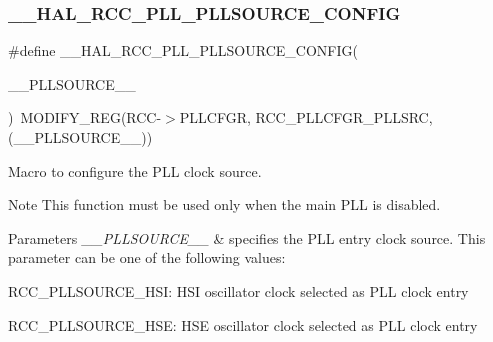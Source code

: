 \subsubsection{\texorpdfstring{\+\_\+\+\_\+\+H\+A\+L\+\_\+\+R\+C\+C\+\_\+\+P\+L\+L\+\_\+\+P\+L\+L\+S\+O\+U\+R\+C\+E\+\_\+\+C\+O\+N\+F\+IG}{\_\_HAL\_RCC\_PLL\_PLLSOURCE\_CONFIG}}
{\footnotesize\ttfamily \#define \+\_\+\+\_\+\+H\+A\+L\+\_\+\+R\+C\+C\+\_\+\+P\+L\+L\+\_\+\+P\+L\+L\+S\+O\+U\+R\+C\+E\+\_\+\+C\+O\+N\+F\+IG(\begin{DoxyParamCaption}\item[{}]{\+\_\+\+\_\+\+P\+L\+L\+S\+O\+U\+R\+C\+E\+\_\+\+\_\+ }\end{DoxyParamCaption})~M\+O\+D\+I\+F\+Y\+\_\+\+R\+EG(R\+CC-\/$>$P\+L\+L\+C\+F\+GR, R\+C\+C\+\_\+\+P\+L\+L\+C\+F\+G\+R\+\_\+\+P\+L\+L\+S\+RC, (\+\_\+\+\_\+\+P\+L\+L\+S\+O\+U\+R\+C\+E\+\_\+\+\_\+))}



Macro to configure the P\+LL clock source. 

\begin{DoxyNote}{Note}
This function must be used only when the main P\+LL is disabled. 
\end{DoxyNote}

\begin{DoxyParams}{Parameters}
{\em \+\_\+\+\_\+\+P\+L\+L\+S\+O\+U\+R\+C\+E\+\_\+\+\_\+} & specifies the P\+LL entry clock source. This parameter can be one of the following values\+: \begin{DoxyItemize}
\item R\+C\+C\+\_\+\+P\+L\+L\+S\+O\+U\+R\+C\+E\+\_\+\+H\+SI\+: H\+SI oscillator clock selected as P\+LL clock entry \item R\+C\+C\+\_\+\+P\+L\+L\+S\+O\+U\+R\+C\+E\+\_\+\+H\+SE\+: H\+SE oscillator clock selected as P\+LL clock entry \end{DoxyItemize}
\\
\hline
\end{DoxyParams}
